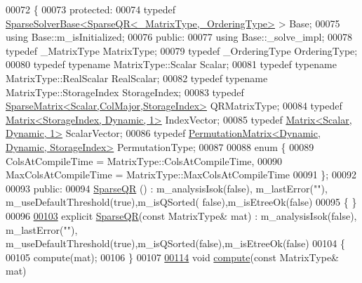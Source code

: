 \begin{DoxyCode}
00072 \{
00073   \textcolor{keyword}{protected}:
00074     \textcolor{keyword}{typedef} \hyperlink{group___sparse_core___module_class_eigen_1_1_sparse_solver_base}{SparseSolverBase<SparseQR<\_MatrixType,\_OrderingType>}
       > Base;
00075     \textcolor{keyword}{using} Base::m\_isInitialized;
00076   \textcolor{keyword}{public}:
00077     \textcolor{keyword}{using} Base::\_solve\_impl;
00078     \textcolor{keyword}{typedef} \_MatrixType MatrixType;
00079     \textcolor{keyword}{typedef} \_OrderingType OrderingType;
00080     \textcolor{keyword}{typedef} \textcolor{keyword}{typename} MatrixType::Scalar Scalar;
00081     \textcolor{keyword}{typedef} \textcolor{keyword}{typename} MatrixType::RealScalar RealScalar;
00082     \textcolor{keyword}{typedef} \textcolor{keyword}{typename} MatrixType::StorageIndex StorageIndex;
00083     \textcolor{keyword}{typedef} \hyperlink{group___sparse_core___module}{SparseMatrix<Scalar,ColMajor,StorageIndex>} 
      QRMatrixType;
00084     \textcolor{keyword}{typedef} \hyperlink{group___core___module}{Matrix<StorageIndex, Dynamic, 1>} IndexVector;
00085     \textcolor{keyword}{typedef} \hyperlink{group___core___module}{Matrix<Scalar, Dynamic, 1>} ScalarVector;
00086     \textcolor{keyword}{typedef} \hyperlink{group___core___module}{PermutationMatrix<Dynamic, Dynamic, StorageIndex>}
       PermutationType;
00087 
00088     \textcolor{keyword}{enum} \{
00089       ColsAtCompileTime = MatrixType::ColsAtCompileTime,
00090       MaxColsAtCompileTime = MatrixType::MaxColsAtCompileTime
00091     \};
00092     
00093   \textcolor{keyword}{public}:
00094     \hyperlink{group___sparse_q_r___module_class_eigen_1_1_sparse_q_r}{SparseQR} () :  m\_analysisIsok(\textcolor{keyword}{false}), m\_lastError(\textcolor{stringliteral}{""}), m\_useDefaultThreshold(\textcolor{keyword}{true}),m\_isQSorted(\textcolor{keyword}{
      false}),m\_isEtreeOk(\textcolor{keyword}{false})
00095     \{ \}
00096     
\hyperlink{group___sparse_q_r___module_ac50f705d686d4bc687ce6acbc76447d2}{00103}     \textcolor{keyword}{explicit} \hyperlink{group___sparse_q_r___module_ac50f705d686d4bc687ce6acbc76447d2}{SparseQR}(\textcolor{keyword}{const} MatrixType& mat) : m\_analysisIsok(false), m\_lastError(\textcolor{stringliteral}{""}), 
      m\_useDefaultThreshold(true),m\_isQSorted(false),m\_isEtreeOk(false)
00104     \{
00105       compute(mat);
00106     \}
00107     
\hyperlink{group___sparse_q_r___module_aedaf52b7543de4d55c58c8f830c2aeb7}{00114}     \textcolor{keywordtype}{void} \hyperlink{group___sparse_q_r___module_aedaf52b7543de4d55c58c8f830c2aeb7}{compute}(\textcolor{keyword}{const} MatrixType& mat)

\end{DoxyCode}
